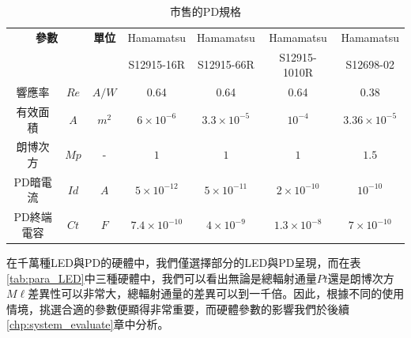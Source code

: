     \begin{table}[htpb]
            \renewcommand{\arraystretch}{1.3}
            \setlength{\arrayrulewidth}{0.15mm}
            \setlength{\doublerulesep}{0.12mm}
            \caption{市售的PD規格\cite{datasheet:hm_pd}}
            \label{tab:para_PD}
            \centering
            \begin{tabular}{|cc|c|| c|c|c|c|}
            \hline
            \multicolumn{2}{|c|}{\textbf{參數}} & \textbf{單位}  
            & {Hamamatsu}&{Hamamatsu} &{Hamamatsu} &{Hamamatsu}  \\
            \multicolumn{2}{|c|}{} & {}  
            & {S12915-16R}& {S12915-66R}& {S12915-1010R}& {S12698-02}
            \\
            \hline
            響應率 &$Re$ & $A/W$ & 0.64& 0.64& 0.64& 0.38 \\
            有效面積& $A$& $m^2$ & 
            $6\times 10^{-6}$ & 
            $3.3\times 10^{-5}$ & 
            $10^{-4}$ & 
            $3.36\times 10^{-5}$\\
            朗博次方& $Mp$& -  & $1$& $1$& $1$& $1.5$\\
            \hline
            PD暗電流 &$Id$ & $A$ 
            & $5\times 10^{-12}$ 
            & $5\times 10^{-11}$
            & $2\times 10^{-10}$
            & $10^{-10}$\\
            PD終端電容 &$Ct$ & $F$ 
            & $7.4\times 10^{-10}$ 
            & $4\times 10^{-9}$
            & $1.3\times 10^{-8}$
            & $7\times 10^{-10}$\\
            \hline
            \end{tabular}
    \end{table}
    
    在千萬種LED與PD的硬體中，我們僅選擇部分的LED與PD呈現，而在表\ref{tab:para_LED}中三種硬體中，我們可以看出無論是總輻射通量$Pt$還是朗博次方$M\ell$差異性可以非常大，總輻射通量的差異可以到一千倍。因此，根據不同的使用情境，挑選合適的參數便顯得非常重要，而硬體參數的影響我們於後續\ref{chp:system_evaluate}章中分析。

